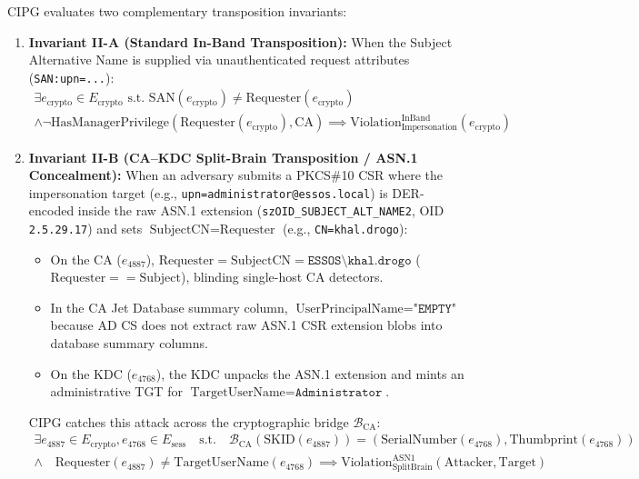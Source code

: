 CIPG evaluates two complementary transposition invariants:
\begin{enumerate}
    \item \textbf{Invariant II-A (Standard In-Band Transposition):}
    When the Subject Alternative Name is supplied via unauthenticated request attributes (\texttt{SAN:upn=...}):
    \begin{equation}
    \begin{aligned}
    \exists e_{\text{crypto}} \in E_{\text{crypto}} \text{ s.t. } \text{SAN}(e_{\text{crypto}}) \neq \text{Requester}(e_{\text{crypto}}) \\
    \wedge \neg \text{HasManagerPrivilege}(\text{Requester}(e_{\text{crypto}}), \text{CA}) \implies \text{Violation}_{\text{Impersonation}}^{\text{InBand}}(e_{\text{crypto}})
    \end{aligned}
    \end{equation}
    
    \item \textbf{Invariant II-B (CA--KDC Split-Brain Transposition / ASN.1 Concealment):}
    When an adversary submits a PKCS\#10 CSR where the impersonation target (e.g., \texttt{upn=administrator@essos.local}) is DER-encoded inside the raw ASN.1 extension (\texttt{szOID\_SUBJECT\_ALT\_NAME2}, OID \texttt{2.5.29.17}) and sets $\text{SubjectCN} = \text{Requester}$ (e.g., \texttt{CN=khal.drogo}):
    \begin{itemize}
        \item On the CA ($e_{4887}$), $\text{Requester} = \text{SubjectCN} = \texttt{ESSOS\textbackslash khal.drogo}$ ($\text{Requester} == \text{Subject}$), blinding single-host CA detectors.
        \item In the CA Jet Database summary column, $\text{UserPrincipalName} = \texttt{"EMPTY"}$ because AD CS does not extract raw ASN.1 CSR extension blobs into database summary columns.
        \item On the KDC ($e_{4768}$), the KDC unpacks the ASN.1 extension and mints an administrative TGT for $\text{TargetUserName} = \texttt{Administrator}$.
    \end{itemize}
    CIPG catches this attack across the cryptographic bridge $\mathcal{B}_{\text{CA}}$:
    \begin{equation}
    \begin{aligned}
    \exists e_{4887} \in E_{\text{crypto}}, e_{4768} \in E_{\text{sess}} \quad \text{s.t.} \quad \mathcal{B}_{\text{CA}}(\text{SKID}(e_{4887})) = (\text{SerialNumber}(e_{4768}), \text{Thumbprint}(e_{4768})) \\
    \wedge \quad \text{Requester}(e_{4887}) \neq \text{TargetUserName}(e_{4768}) \implies \text{Violation}_{\text{SplitBrain}}^{\text{ASN1}}(\text{Attacker}, \text{Target})
    \end{aligned}
    \end{equation}
\end{enumerate}

